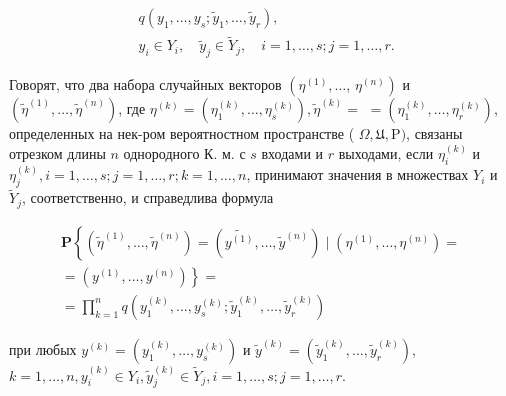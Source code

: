 \documentclass[10pt]{article}
\begin{document}
\[

\begin{aligned}

& q\left(y_{1}, \ldots, y_{s} ; \tilde{y}_{1}, \ldots, \tilde{y}_{r}\right), \\

& y_{i} \in Y_{i}, \quad \tilde{y}_{j} \in \tilde{Y}_{j}, \quad i=1, \ldots, s ; j=1, \ldots, r .

\end{aligned}

\]



Говорят, что два набора случайных векторов $\left(\eta^{(1)}, \ldots\right.$, $\left.\eta^{(n)}\right)$ и $\left(\tilde{\eta}^{(1)}, \ldots, \tilde{\eta}^{(n)}\right)$, где $\eta^{(k)}=\left(\eta_{1}^{(k)}, \ldots, \eta_{s}^{(k)}\right), \tilde{\eta}^{(k)}=$ $=\left(\eta_{1}^{(k)}, \ldots, \eta_{r}^{(k)}\right)$, определенных на нек-ром вероятностном пространстве ( $\Omega, \mathfrak{U}, \mathrm{P})$, связаны отрезком длины $n$ однородного К. м. с $s$ входами и $r$ выходами, если $\eta_{i}^{(k)}$ и $\eta_{j}^{(k)}, i=1, \ldots, s ; j=1, \ldots, r ; k=1, \ldots, n$, принимают значения в множествах $Y_{i}$ и $\widetilde{Y}_{j}$, соответственно, и справедлива формула



\[

\begin{gathered}

\mathbf{P}\left\{\left(\tilde{\eta}^{(1)}, \ldots, \tilde{\eta}^{(n)}\right)=\left(\tilde{y^{(1)}}, \ldots, \tilde{y}^{(n)}\right) \mid\left(\eta^{(1)}, \ldots, \eta^{(n)}\right)=\right. \\

\left.=\left(y^{(1)}, \ldots, y^{(n)}\right)\right\}= \\

=\prod_{k=1}^{n} q\left(y_{1}^{(k)}, \ldots, y_{s}^{(k)} ; \tilde{y}_{1}^{(k)}, \ldots, \tilde{y}_{r}^{(k)}\right)

\end{gathered}

\]



при любых $y^{(k)}=\left(y_{1}^{(k)}, \ldots, y_{s}^{(k)}\right)$ и $\tilde{y}^{(k)}=\left(\tilde{y}_{1}^{(k)}, \ldots, \tilde{y}_{r}^{(k)}\right)$, $k=1, \ldots, n, y_{i}^{(k)} \in Y_{i}, \tilde{y}_{j}^{(k)} \in \tilde{Y}_{j}, i=1, \ldots, s ; j=1, \ldots, r$.
\end{document}
